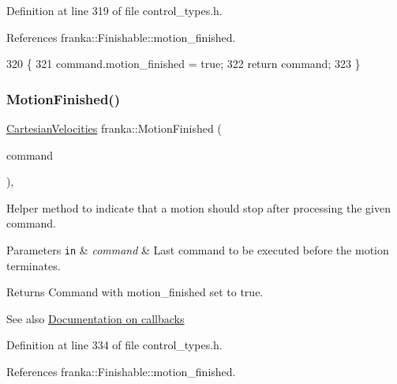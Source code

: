 Definition at line 319 of file control\+\_\+types.\+h.



References franka\+::\+Finishable\+::motion\+\_\+finished.


\begin{DoxyCode}
320                                     \{
321   command.motion\_finished = \textcolor{keyword}{true};
322   \textcolor{keywordflow}{return} command;
323 \}
\end{DoxyCode}
\mbox{\label{namespacefranka_a5898ad5e3bbc2682c24c0415bf7e9a95}} 
\subsubsection{\texorpdfstring{Motion\+Finished()}{MotionFinished()}\hspace{0.1cm}{\footnotesize\ttfamily [5/5]}}
{\footnotesize\ttfamily \hyperlink{classfranka_1_1CartesianVelocities}{Cartesian\+Velocities} franka\+::\+Motion\+Finished (\begin{DoxyParamCaption}\item[{\hyperlink{classfranka_1_1CartesianVelocities}{Cartesian\+Velocities}}]{command }\end{DoxyParamCaption})\hspace{0.3cm}{\ttfamily [inline]}, {\ttfamily [noexcept]}}

Helper method to indicate that a motion should stop after processing the given command.


\begin{DoxyParams}[1]{Parameters}
\mbox{\tt in}  & {\em command} & Last command to be executed before the motion terminates.\\
\hline
\end{DoxyParams}
\begin{DoxyReturn}{Returns}
Command with motion\+\_\+finished set to true.
\end{DoxyReturn}
\begin{DoxySeeAlso}{See also}
\hyperlink{classfranka_1_1Robot_callback-docs}{Documentation on callbacks} 
\end{DoxySeeAlso}


Definition at line 334 of file control\+\_\+types.\+h.



References franka\+::\+Finishable\+::motion\+\_\+finished.


